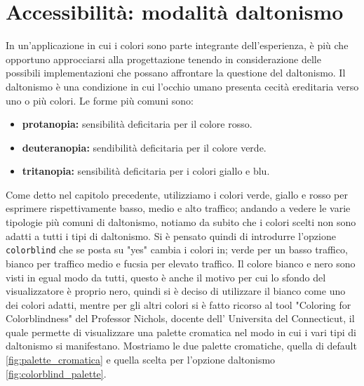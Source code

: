 \documentclass[binding=0.6cm]{sapthesis}
\begin{document}
\section{Accessibilità: modalità daltonismo}
In un'applicazione in cui i colori sono parte integrante dell'esperienza, è più che opportuno approcciarsi alla progettazione tenendo
in considerazione delle possibili implementazioni che possano affrontare la questione del daltonismo. 
Il daltonismo è una condizione in cui l'occhio umano presenta cecità ereditaria verso uno o più colori. Le forme più comuni sono:
\begin{itemize}
    \item \textbf{protanopia:} sensibilità deficitaria per il colore rosso.
    \item \textbf{deuteranopia:} sendibilità deficitaria per il colore verde.
    \item \textbf{tritanopia:} sensibilità deficitaria per i colori giallo e blu.
\end{itemize}
Come detto nel capitolo precedente, utilizziamo
i colori verde, giallo e rosso per esprimere rispettivamente basso, medio e alto traffico; andando a vedere le varie tipologie più comuni di daltonismo, 
notiamo da subito che i colori scelti non sono adatti a tutti i tipi di daltonismo. Si è pensato quindi di introdurre l'opzione
\texttt{colorblind} che se posta su "yes" cambia i colori in; verde per un basso traffico, bianco per traffico medio e fucsia per elevato traffico.
Il colore bianco e nero sono visti in egual modo da tutti, questo è anche il motivo per cui lo sfondo del visualizzatore è proprio nero, quindi si è
deciso di utilizzare il bianco come uno dei colori adatti, mentre per gli altri colori si è fatto ricorso al tool "Coloring for Colorblindness" \cite{ColorBlindPalette2024} 
del Professor Nichols, docente dell' Universita del Connecticut, il quale permette di visualizzare una palette cromatica nel modo in cui i vari tipi
di daltonismo si manifestano. Mostriamo le due palette cromatiche, quella di default \ref{fig:palette_cromatica} e quella scelta per l'opzione daltonismo \ref{fig:colorblind_palette}.
\end{document}
